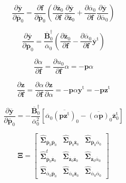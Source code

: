 \documentclass[aip,jcp,reprint,amsmath,amssymb]{revtex4-1}
\newcommand{\mt}[1]{\boldsymbol{\mathbf{#1}}}           %
\newcommand{\vt}[1]{\boldsymbol{\mathbf{#1}}}           %
\newcommand{\tr}[1]{#1^\text{t}}                        %
\begin{document}
\begin{equation*}
\frac{\partial \overline{\vt y}}{\partial \overline{\vt p}_0} =
\frac{\partial \vt f}{\partial \overline{\vt p}_0} \left( \frac{\partial \overline{\vt z}_0}{\partial \vt f} \frac{\partial \overline{\vt y}}{\partial \overline{\vt z}_0} + \frac{\partial \overline{\alpha}_0}{\partial \vt f} \frac{\partial \overline{\vt y}}{\partial \overline{\alpha}_0} \right)
\end{equation*}

\begin{equation*}
\frac{\partial \overline{\vt y}}{\partial \overline{\vt p}_0} =
\frac{\overline{\mt B}_0^\dag}{\overline{\alpha}_0} \left( \frac{\partial \overline{\vt z}_0}{\partial \vt f} - \frac{\partial \overline{\alpha}_0}{\partial \vt f} \tr{\overline{\vt y}} \right)
\end{equation*}

\begin{equation*}
\frac{\partial \alpha}{\partial \vt f} = \frac{\partial u_0}{\partial \vt f} \alpha = -{\vt p}\alpha
\end{equation*}

\begin{equation*}
\frac{\partial \vt z}{\partial \vt f} = \frac{\partial \alpha}{\partial \vt f} \frac{\partial \vt z}{\partial \alpha} = -{\vt p} \alpha \tr{\vt y} = -{\vt p} \tr{\vt z}
\end{equation*}


\begin{equation*}
\frac{\partial \overline{\vt y}}{\partial \overline{\vt p}_0} =
-\frac{\overline{\mt B}_0^\dag}{\overline{\alpha}_0^2} \left[\overline{\alpha}_0 \overline{(\vt p\tr{\vt z})}_0 - \overline{(\alpha \vt p)}_0 \tr{\overline{\vt z}}_0 \right]
\end{equation*}


\begin{equation*}
\mt \Xi = \left[\begin{array}{ccc}
\hat{\mt \Sigma}_{\overline{\vt p}_0 \overline{\vt p}_0} & \hat{\mt \Sigma}_{\overline{\vt p}_0 \overline{\vt z}_0} & \hat{\mt \Sigma}_{\overline{\vt p}_0 \overline{\alpha}_0} \\
\hat{\mt \Sigma}^t_{\overline{\vt p}_0 \overline{\vt z}_0} & \hat{\mt \Sigma}_{\overline{\vt z}_0 \overline{\vt z}_0} & \hat{\mt \Sigma}_{\overline{\vt z}_0 \overline{\alpha}_0} \\
\hat{\mt \Sigma}_{\overline{\alpha}_0 \overline{\vt p}_0} & \hat{\mt \Sigma}_{\overline{\alpha}_0 \overline{\vt z}_0} & \hat{\mt \Sigma}_{\overline{\alpha}_0 \overline{\alpha}_0}
\end{array}\right]
\end{equation*}
\end{document}
